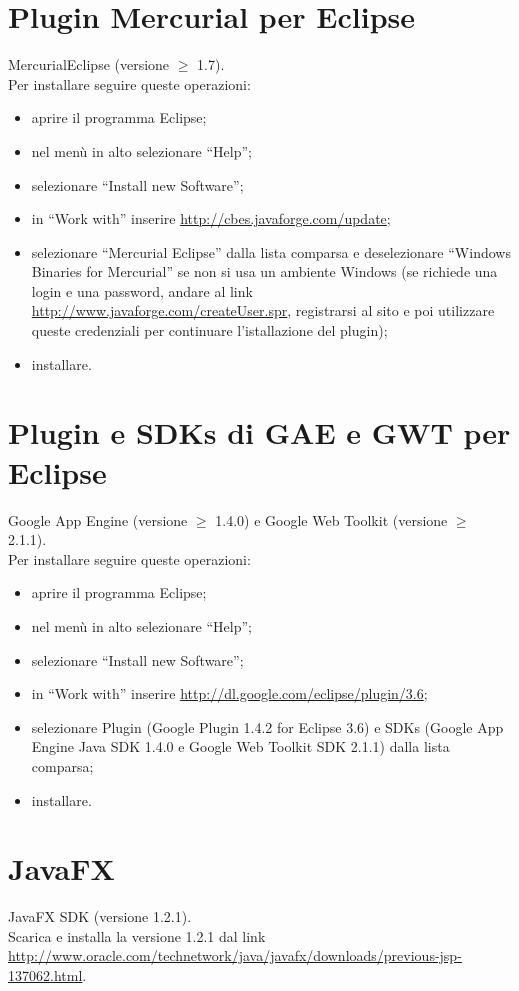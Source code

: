 \section{Plugin Mercurial per Eclipse}
MercurialEclipse (versione $\geq$ 1.7). 
\\
Per installare seguire queste
operazioni: 
\begin{itemize}
\item {aprire il programma Eclipse;} 
\item {nel men\`u in alto selezionare ``Help'';}
\item {selezionare ``Install new Software'';}
\item {in ``Work with'' inserire \url{http://cbes.javaforge.com/update};}
\item {selezionare ``Mercurial Eclipse'' dalla lista comparsa e deselezionare
``Windows Binaries for Mercurial'' se non si usa un ambiente Windows (se
richiede una login e una password, andare al link
\url{http://www.javaforge.com/createUser.spr}, registrarsi al sito e poi
utilizzare queste credenziali per continuare l'istallazione del plugin);}
\item {installare.}
\end{itemize}

\section{Plugin e SDKs di GAE e GWT per Eclipse}
Google App Engine (versione $\geq$ 1.4.0) e Google Web Toolkit (versione $\geq$
2.1.1).
\\
Per installare seguire queste
operazioni: 
\begin{itemize}
\item {aprire il programma Eclipse;} 
\item {nel men\`u in alto selezionare ``Help'';}
\item {selezionare ``Install new Software'';}
\item {in ``Work with'' inserire \url{http://dl.google.com/eclipse/plugin/3.6};}
\item {selezionare Plugin (Google Plugin 1.4.2 for Eclipse 3.6) e SDKs (Google
App Engine Java SDK 1.4.0 e Google Web Toolkit SDK 2.1.1) dalla lista comparsa;}
\item {installare.}
\end{itemize} 

\section{JavaFX}
JavaFX SDK (versione 1.2.1).
\\
Scarica e installa la versione 1.2.1 dal link \\
\url{http://www.oracle.com/technetwork/java/javafx/downloads/previous-jsp-137062.html}.

